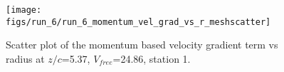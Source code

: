 \begin{figure}[H]
\centering
\texttt{[image: figs/run\_6/run\_6\_momentum\_vel\_grad\_vs\_r\_meshscatter]}
\caption{Scatter plot of the momentum based velocity gradient term vs radius at $z/c$=5.37, $V_{free}$=24.86, station 1.}
\label{fig:run_6_momentum_vel_grad_vs_r_meshscatter}
\end{figure}


